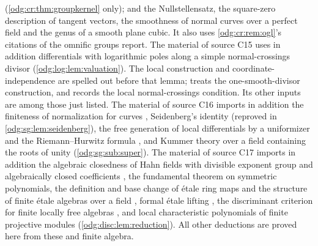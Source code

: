 \documentclass[11pt,oneside]{article}
\numberwithin{equation}{section}
\theoremstyle{definition}
\theoremstyle{remark}
\begin{document}
\cite{MilneAG} (\cref{odg:cr:thm:groupkernel} only); and the Nullstellensatz, the
square-zero description of tangent vectors, the smoothness of normal curves over a
perfect field and the genus of a smooth plane cubic. It also uses
\cref{odg:cr:rem:ogl}'s citations of the omnific groups report. The material of source
C15 uses in addition differentials with logarithmic poles along a simple
normal-crossings divisor (\cref{odg:log:lem:valuation}). The local
construction and coordinate-independence are spelled out before that lemma;
\cite[Tag 0FMU]{StacksLog} treats the one-smooth-divisor construction,
and \cite[Tag 0BI9]{StacksSNC} records the local normal-crossings condition.
Its other inputs are among those just listed.
The material of source C16 imports in addition the finiteness of normalization for curves
\cite{StacksNormal,StacksCurves}, Seidenberg's identity \cite{Seidenberg} (reproved in
\cref{odg:sg:lem:seidenberg}), the free generation of local differentials by a
uniformizer and the Riemann--Hurwitz formula \cite{StacksRH}, and Kummer theory over a
field containing the roots of unity (\cref{odg:sg:sub:super}).
The material of source C17 imports in addition the algebraic closedness of Hahn fields with
divisible exponent group and algebraically closed coefficients \cite[Fact 2.1.1]{LM}, the
fundamental theorem on symmetric polynomials, the definition and base change of \'etale
ring maps and the structure of finite \'etale algebras over a field
\cite{StacksEtale,StacksEtaleField}, formal \'etale lifting \cite{StacksFormal}, the
discriminant criterion for finite locally free algebras \cite{StacksDisc}, and local
characteristic polynomials of finite projective modules (\cref{odg:disc:lem:reduction}).
All other deductions are proved here from these and finite algebra.
\end{document}
